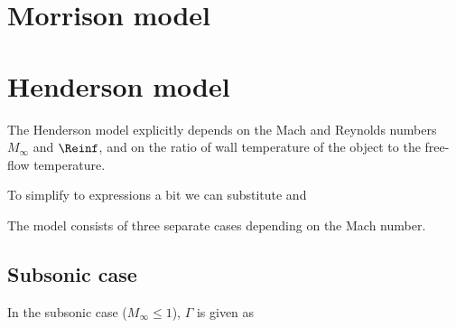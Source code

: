 \section{Morrison model} \label{DM}


\section{Henderson model} \label{DH}
    The Henderson model \cite{henderson1976} explicitly depends on the Mach
    and Reynolds numbers $M_\infty$ and $\Reinf$,
    and on the ratio of wall temperature of the object to the free-flow temperature.

    To simplify to expressions a bit we can substitute
    and

    The model consists of three separate cases depending on the Mach number.

    \subsection{Subsonic case}
        In the subsonic case ($M_\infty \leq 1$), $\Gamma$ is given as

